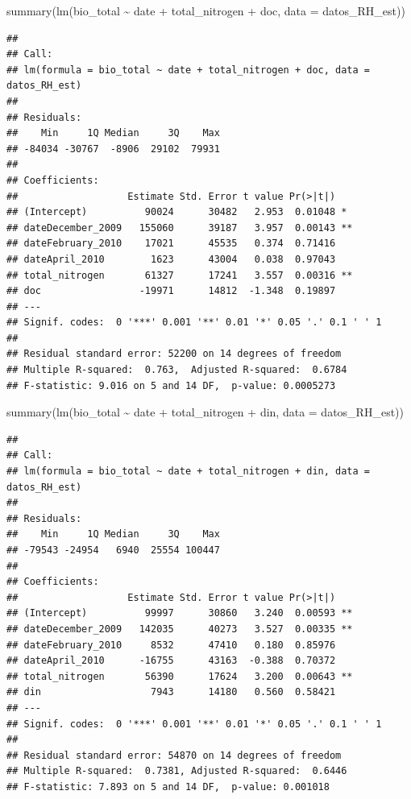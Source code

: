 \documentclass[
]{book}
\newenvironment{Shaded}{\begin{snugshade}}{\end{snugshade}}
\newcommand{\AttributeTok}[1]{\textcolor[rgb]{0.77,0.63,0.00}{#1}}
\newcommand{\FunctionTok}[1]{\textcolor[rgb]{0.00,0.00,0.00}{#1}}
\newcommand{\NormalTok}[1]{#1}
\newcommand{\SpecialCharTok}[1]{\textcolor[rgb]{0.00,0.00,0.00}{#1}}
\begin{document}
\begin{Shaded}
\begin{Highlighting}[]
\FunctionTok{summary}\NormalTok{(}\FunctionTok{lm}\NormalTok{(bio\_total }\SpecialCharTok{\textasciitilde{}}\NormalTok{ date }\SpecialCharTok{+}\NormalTok{ total\_nitrogen }\SpecialCharTok{+}\NormalTok{ doc, }\AttributeTok{data =}\NormalTok{ datos\_RH\_est)) }
\end{Highlighting}
\end{Shaded}

\begin{verbatim}
## 
## Call:
## lm(formula = bio_total ~ date + total_nitrogen + doc, data = datos_RH_est)
## 
## Residuals:
##    Min     1Q Median     3Q    Max 
## -84034 -30767  -8906  29102  79931 
## 
## Coefficients:
##                   Estimate Std. Error t value Pr(>|t|)   
## (Intercept)          90024      30482   2.953  0.01048 * 
## dateDecember_2009   155060      39187   3.957  0.00143 **
## dateFebruary_2010    17021      45535   0.374  0.71416   
## dateApril_2010        1623      43004   0.038  0.97043   
## total_nitrogen       61327      17241   3.557  0.00316 **
## doc                 -19971      14812  -1.348  0.19897   
## ---
## Signif. codes:  0 '***' 0.001 '**' 0.01 '*' 0.05 '.' 0.1 ' ' 1
## 
## Residual standard error: 52200 on 14 degrees of freedom
## Multiple R-squared:  0.763,  Adjusted R-squared:  0.6784 
## F-statistic: 9.016 on 5 and 14 DF,  p-value: 0.0005273
\end{verbatim}

\begin{Shaded}
\begin{Highlighting}[]
\FunctionTok{summary}\NormalTok{(}\FunctionTok{lm}\NormalTok{(bio\_total }\SpecialCharTok{\textasciitilde{}}\NormalTok{ date }\SpecialCharTok{+}\NormalTok{ total\_nitrogen }\SpecialCharTok{+}\NormalTok{ din, }\AttributeTok{data =}\NormalTok{ datos\_RH\_est)) }
\end{Highlighting}
\end{Shaded}

\begin{verbatim}
## 
## Call:
## lm(formula = bio_total ~ date + total_nitrogen + din, data = datos_RH_est)
## 
## Residuals:
##    Min     1Q Median     3Q    Max 
## -79543 -24954   6940  25554 100447 
## 
## Coefficients:
##                   Estimate Std. Error t value Pr(>|t|)   
## (Intercept)          99997      30860   3.240  0.00593 **
## dateDecember_2009   142035      40273   3.527  0.00335 **
## dateFebruary_2010     8532      47410   0.180  0.85976   
## dateApril_2010      -16755      43163  -0.388  0.70372   
## total_nitrogen       56390      17624   3.200  0.00643 **
## din                   7943      14180   0.560  0.58421   
## ---
## Signif. codes:  0 '***' 0.001 '**' 0.01 '*' 0.05 '.' 0.1 ' ' 1
## 
## Residual standard error: 54870 on 14 degrees of freedom
## Multiple R-squared:  0.7381, Adjusted R-squared:  0.6446 
## F-statistic: 7.893 on 5 and 14 DF,  p-value: 0.001018
\end{verbatim}
\end{document}

